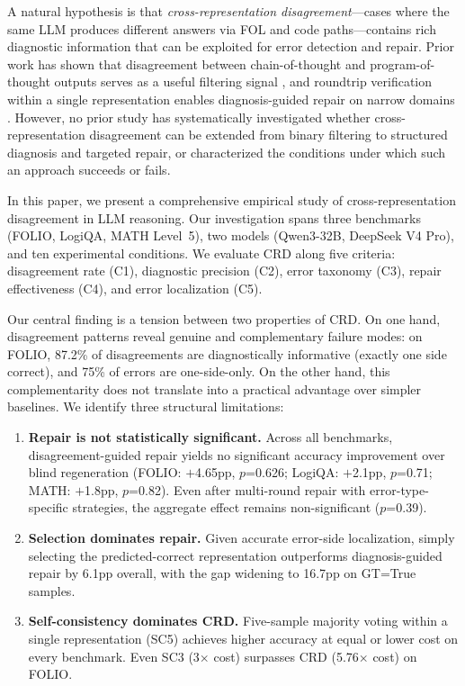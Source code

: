 \documentclass[11pt]{article}
\begin{document}
A natural hypothesis is that \emph{cross-representation disagreement}---cases where the same LLM produces different answers via FOL and code paths---contains rich diagnostic information that can be exploited for error detection and repair. Prior work has shown that disagreement between chain-of-thought and program-of-thought outputs serves as a useful filtering signal \citep{liang2024filtering}, and roundtrip verification within a single representation enables diagnosis-guided repair on narrow domains \citep{roundtrip2026}. However, no prior study has systematically investigated whether cross-representation disagreement can be extended from binary filtering to structured diagnosis and targeted repair, or characterized the conditions under which such an approach succeeds or fails.

In this paper, we present a comprehensive empirical study of cross-representation disagreement in LLM reasoning. Our investigation spans three benchmarks (FOLIO, LogiQA, MATH Level~5), two models (Qwen3-32B, DeepSeek V4 Pro), and ten experimental conditions. We evaluate CRD along five criteria: disagreement rate (C1), diagnostic precision (C2), error taxonomy (C3), repair effectiveness (C4), and error localization (C5).

Our central finding is a tension between two properties of CRD. On one hand, disagreement patterns reveal genuine and complementary failure modes: on FOLIO, 87.2\% of disagreements are diagnostically informative (exactly one side correct), and 75\% of errors are one-side-only. On the other hand, this complementarity does not translate into a practical advantage over simpler baselines. We identify three structural limitations:

\begin{enumerate}
    \item \textbf{Repair is not statistically significant.} Across all benchmarks, disagreement-guided repair yields no significant accuracy improvement over blind regeneration (FOLIO: $+$4.65pp, $p$=0.626; LogiQA: $+$2.1pp, $p$=0.71; MATH: $+$1.8pp, $p$=0.82). Even after multi-round repair with error-type-specific strategies, the aggregate effect remains non-significant ($p$=0.39).
    \item \textbf{Selection dominates repair.} Given accurate error-side localization, simply selecting the predicted-correct representation outperforms diagnosis-guided repair by 6.1pp overall, with the gap widening to 16.7pp on GT=True samples.
    \item \textbf{Self-consistency dominates CRD.} Five-sample majority voting within a single representation (SC5) achieves higher accuracy at equal or lower cost on every benchmark. Even SC3 (3$\times$ cost) surpasses CRD (5.76$\times$ cost) on FOLIO.
\end{enumerate}
\end{document}
